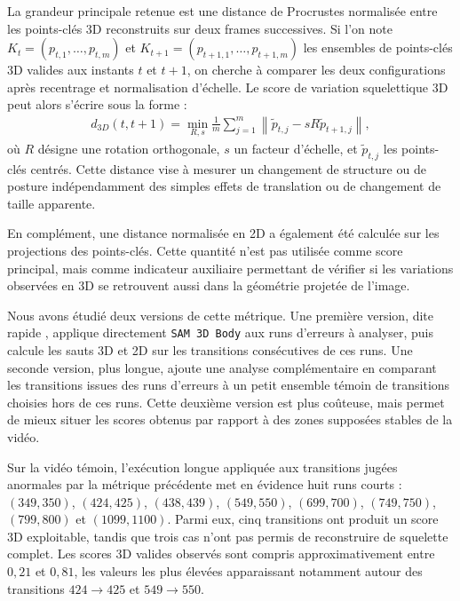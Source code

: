 \documentclass[11pt,a4paper]{article}
\begin{document}
La grandeur principale retenue est une distance de Procrustes normalisée entre les points-clés 3D reconstruits sur deux frames successives. Si l'on note $K_t = (p_{t,1}, \dots, p_{t,m})$ et $K_{t+1} = (p_{t+1,1}, \dots, p_{t+1,m})$ les ensembles de points-clés 3D valides aux instants $t$ et $t+1$, on cherche à comparer les deux configurations après recentrage et normalisation d'échelle. Le score de variation squelettique 3D peut alors s'écrire sous la forme :
\begin{align}
    d_{3D}(t, t+1) = \min_{R,s} \frac{1}{m} \sum_{j=1}^{m} \left\| \tilde{p}_{t,j} - s R \tilde{p}_{t+1,j} \right\|,
\end{align}
où $R$ désigne une rotation orthogonale, $s$ un facteur d'échelle, et $\tilde{p}_{t,j}$ les points-clés centrés. Cette distance vise à mesurer un changement de structure ou de posture indépendamment des simples effets de translation ou de changement de taille apparente.

En complément, une distance normalisée en 2D a également été calculée sur les projections des points-clés. Cette quantité n'est pas utilisée comme score principal, mais comme indicateur auxiliaire permettant de vérifier si les variations observées en 3D se retrouvent aussi dans la géométrie projetée de l'image.

Nous avons étudié deux versions de cette métrique. Une première version, dite \og rapide \fg{}, applique directement \texttt{SAM 3D Body} aux runs d'erreurs à analyser, puis calcule les sauts 3D et 2D sur les transitions consécutives de ces runs. Une seconde version, plus longue, ajoute une analyse complémentaire en comparant les transitions issues des runs d'erreurs à un petit ensemble témoin de transitions choisies hors de ces runs. Cette deuxième version est plus coûteuse, mais permet de mieux situer les scores obtenus par rapport à des zones supposées stables de la vidéo.

Sur la vidéo témoin, l'exécution longue appliquée aux transitions jugées anormales par la métrique précédente met en évidence huit runs courts :
$(349,350)$, $(424,425)$, $(438,439)$, $(549,550)$, $(699,700)$, $(749,750)$, $(799,800)$ et $(1099,1100)$.
Parmi eux, cinq transitions ont produit un score 3D exploitable, tandis que trois cas n'ont pas permis de reconstruire de squelette complet. Les scores 3D valides observés sont compris approximativement entre $0{,}21$ et $0{,}81$, les valeurs les plus élevées apparaissant notamment autour des transitions $424 \rightarrow 425$ et $549 \rightarrow 550$.
\end{document}
